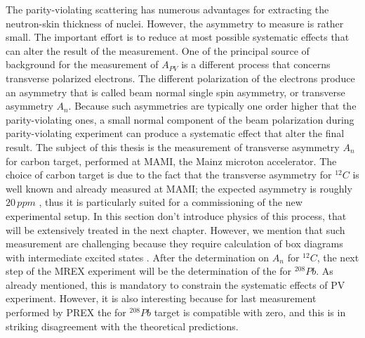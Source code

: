 
The parity-violating scattering has numerous advantages for extracting the neutron-skin thickness of nuclei. However, the asymmetry to measure is rather small. The important effort is to reduce at most possible systematic effects that can alter the result of the measurement. One of the principal source of background for the measurement of $A_{PV}$ is a different process that concerns transverse polarized electrons. The different polarization of the electrons produce an asymmetry that is called beam normal single spin asymmetry, or transverse asymmetry $A_{n}$. Because such asymmetries are typically one order higher that the parity-violating ones, a small normal component of the beam polarization during parity-violating experiment can produce a systematic effect that alter the final result. The subject of this thesis is the measurement of transverse asymmetry $A_{n}$ for carbon target, performed at MAMI, the Mainz microton accelerator. The choice of carbon target is due to the fact that the transverse asymmetry for $^{12}C$ is well known and already measured at MAMI; the expected asymmetry is roughly $20 \, ppm$ , thus it is particularly suited for a commissioning of the new experimental setup. In this section don't introduce physics of this process, that will be extensively treated in the next chapter. However, we mention that such measurement are challenging because they require calculation of box diagrams with intermediate excited states \cite{Gorchtein_2008}.
After the determination on $A_{n}$ for $^{12}C$, the next step of the MREX experiment will be the determination of the \transv for $^{208}Pb$. As already mentioned, this is mandatory to constrain the systematic effects of PV experiment. However, it is also interesting because for last measurement performed by PREX \cite{HAPPEX:2012fud} the \transv for $^{208}Pb$ target is compatible with zero, and this is in striking disagreement with the theoretical predictions. 
